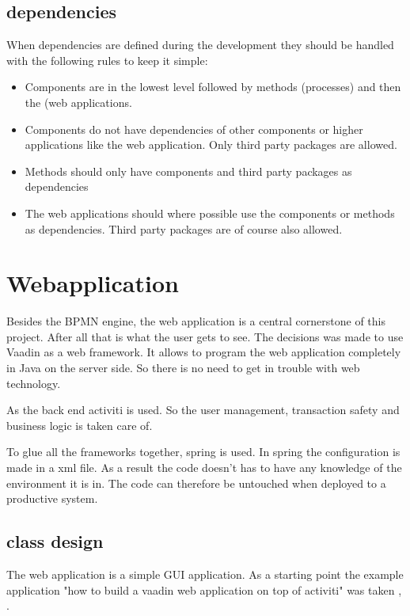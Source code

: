 \documentclass[paper=a4,twoside=false,BCOR=0mm,DIV=calc,fontsize=12pt]{scrartcl}
\begin{document}
\subsection{dependencies}
When dependencies are defined during the development they should be handled with the following rules to keep it simple:
\begin{itemize}
 \item Components are in the lowest level followed by methods (processes) and then the (web applications.
 \item Components do not have dependencies of other components or higher applications like the web application. Only third party packages are allowed.
 \item Methods should only have components and third party packages as dependencies
 \item The web applications should where possible use the components or methods as dependencies. Third party packages are of course also allowed.
\end{itemize}

\section{Webapplication}
Besides the BPMN engine, the web application is a central cornerstone of this project. After all that is what the user gets to see.
The decisions was made to use Vaadin \cite{vaadin} as a web framework. It allows to program the web application completely in Java on the server side. So there is
no need to get in trouble with web technology.

As the back end activiti is used. So the user management, transaction safety and business logic is taken care of.

To glue all the frameworks together, spring is used. In spring the configuration is made in a xml file. As a result the code doesn't has to have any 
knowledge of the environment it is in. The code can therefore be untouched when deployed to a productive system.



\subsection{class design}
The web application is a simple GUI application. As a starting point the example application "how to build a vaadin web application on top of activiti" was taken \cite{vaadinactivitwebapp}, \cite{vaadinactivitwebapp2}.
\end{document}
